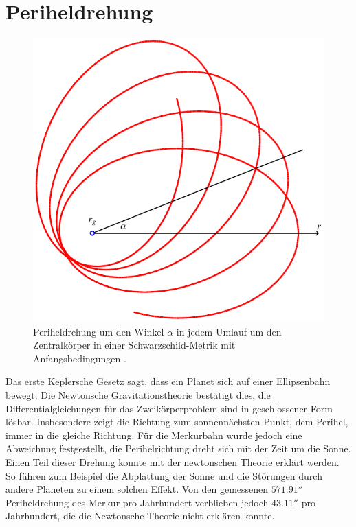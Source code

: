 %
%
%

\section{Periheldrehung}
\begin{figure}
\centering
\includegraphics{chapters/tikz/orbit.pdf}
\caption{Periheldrehung um den Winkel $\alpha$ in jedem Umlauf um den
Zentralkörper in einer Schwarzschild-Metrik mit Anfangsbedingungen
\label{skript:schwarzschild:anfangsbedingung:normal}.
\label{skript:schwarzschild:perihelorbit}}
\end{figure}
Das erste Keplersche Gesetz sagt, dass ein Planet sich auf einer
Ellipsenbahn bewegt.
Die Newtonsche Gravitationstheorie bestätigt dies, die Differentialgleichungen
für das Zweikörperproblem sind in geschlossener Form lösbar.
Insbesondere zeigt die Richtung zum sonnennächsten Punkt, dem Perihel,
immer in die gleiche Richtung.
Für die Merkurbahn wurde jedoch eine Abweichung festgestellt, die
Perihelrichtung dreht sich mit der Zeit um die Sonne.
Einen Teil dieser Drehung konnte mit der newtonschen Theorie erklärt werden.
So führen zum Beispiel die Abplattung der Sonne und die Störungen durch
andere Planeten zu einem solchen Effekt.
Von den gemessenen $571.91''$ Periheldrehung des Merkur pro Jahrhundert
verblieben jedoch $43.11''$ pro Jahrhundert, die die Newtonsche
Theorie nicht erklären konnte.


